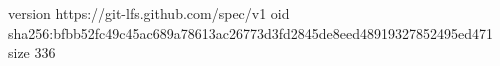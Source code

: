 version https://git-lfs.github.com/spec/v1
oid sha256:bfbb52fc49c45ac689a78613ac26773d3fd2845de8eed48919327852495ed471
size 336
